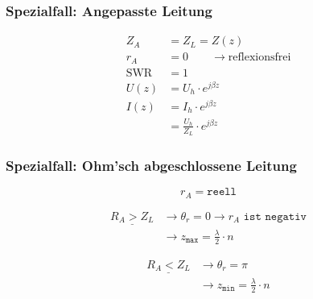 \subsubsection{Spezialfall: Angepasste Leitung}
\begin{align*}
    Z_A          & = Z_L = Z(z)                              \\
    r_A          & = 0\qquad\rightarrow\text{reflexionsfrei} \\
    \mathrm{SWR} & = 1                                       \\
    U(z)         & = U_h\cdot e ^{j\beta z}                  \\
    I(z)         & = I_h \cdot e^{j\beta z}                  \\
                 & = \frac{U_h}{Z_L}\cdot e^{j\beta z}
\end{align*}

\subsubsection{Spezialfall: Ohm'sch abgeschlossene Leitung}
\[
    r_A = \texttt{reell}
\]

\begin{align*}
    \underline{R_A > Z_L} & \rightarrow\theta_r = 0 \rightarrow r_A \texttt{ ist negativ} \\
                          & \rightarrow z_\texttt{max}=\frac{\lambda}{2}\cdot n
\end{align*}

\begin{align*}
    \underline{R_A < Z_L} & \rightarrow\theta_r = \pi                           \\
                          & \rightarrow z_\texttt{min}=\frac{\lambda}{2}\cdot n
\end{align*}

